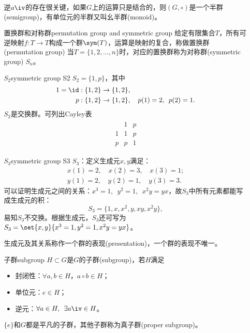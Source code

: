 \begin{remark}
	逆$a\iv$的存在很关键，如果$G$上的运算只是结合的，则$(G,\circ)$是一个半群(semigroup)，有单位元的半群又叫幺半群(monoid)。
\end{remark}
\begin{definition}{置换群和对称群}{permutation group and symmetric group}
	给定有限集合$T$，所有可逆映射$f:T\to T$构成一个群$\sym(T)$，运算是映射的复合，称做置换群(permutation group)
	\tcblower
	当$T=\{1,2,\ldots,n\}$时，对应的置换群称为对称群(symmetric group) $S_n$。
\end{definition}
\begin{example}{$S_2$}{symmetric group S2}
	$S_2=\{1,p\}$，其中 
		\begin{align*}
			1=\id:\{1,2\}\to\{1,2\}&,\\
			p:\{1,2\}\to\{1,2\}&,\quad p(1)=2,\enspace p(2)=1.
		\end{align*}
		$S_2$是交换群。可列出Cayley表
		\begin{align*}
			\begin{array}{c|cc}
				&1&p\\
				\hline
				1&1&p\\
				p&p&1
			\end{array}
		\end{align*}
\end{example}
\begin{example}{$S_3$}{symmetric group S3}
	$S_3$：定义生成元$x,y$满足：
	\begin{align*}
		x(1)=2,\quad x(2)=3,\quad x(3)=1;\\
		y(1)=2,\quad y(2)=1,\quad y(3)=3.
	\end{align*}
	可以证明生成元之间的关系：$x^3=1,\enspace y^2=1,\enspace x^2y=yx$，故$S_3$中所有元素都能写成生成元的积：
	\[
		S_3=\{1,x,x^2,y,xy,x^2y\},
	\]
	易知$S_3$不交换。根据生成元，$S_3$还可写为$S_3=\set{x,y}{x^3=1,y^2=1,x^2y=yx}$。
	
	生成元及其关系称作一个群的表现(presentation)，一个群的表现不唯一。
\end{example}
\begin{definition}{子群}{subgroup}
	$H\subset G$是$G$的子群(subgroup)，若$H$满足
	\begin{itemize}
		\item 封闭性：$\forall a,b\in H$，$a\circ b\in H$；
		\item 单位元：$e\in H$；
		\item 逆元：$\forall a\in H,\enspace\exists a\iv\in H$。
	\end{itemize}
	$\{e\}$和$G$都是平凡的子群，其他子群称为真子群(proper subgroup)。
\end{definition}

